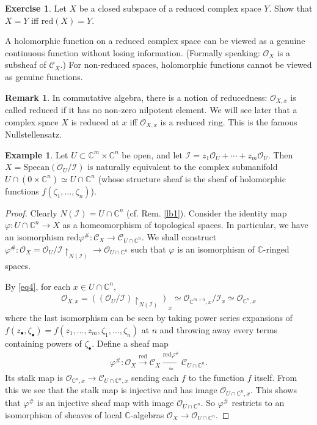 \documentclass[12pt,b5paper,notitlepage]{report}
\theoremstyle{definition}
\newtheorem{eg}[df]{Example}
\newtheorem{exe}[df]{Exercise}
\newtheorem{rem}[df]{Remark}
\theoremstyle{plain}
\newcommand{\mc}{\mathcal}
\newcommand{\scr}{\mathscr}
\newcommand{\blt}{\bullet}
\newcommand{\Cbb}{\mathbb C}
\newcommand{\Specan}{\mathrm{Specan}}
\newcommand{\red}{\mathrm{red}}
\newcommand{\uph}{\upharpoonright}
\numberwithin{equation}{section}
\begin{document}
\begin{exe}
Let $X$ be a closed subspace of a reduced complex space $Y$. Show that $X=Y$ iff $\red(X)=Y$.
\end{exe}

A holomorphic function on a reduced complex space can be viewed as a genuine continuous function without losing information. (Formally speaking: $\scr O_X$ is a subsheaf of $\scr C_X$.) For non-reduced spaces, holomorphic functions cannot be viewed as genuine functions.

\begin{rem}
In commutative algebra, there is a notion of reducedness: $\scr O_{X,x}$ is called reduced if it has no non-zero nilpotent element. We will see later that a complex space $X$ is reduced at $x$ iff $\scr O_{X,x}$ is a reduced ring. This is the famous Nullstellensatz.
\end{rem}

\begin{eg}\label{lb3}
Let $U\subset \Cbb^m\times\Cbb^n$ be open, and let $\mc I=z_1\scr O_U+\cdots+z_m\scr O_U$. Then $X=\Specan(\scr O_U/\mc I)$ is naturally equivalent to the complex submanifold $U\cap (0\times\Cbb^n)\simeq U\cap\Cbb^n$ (whose structure sheaf is the sheaf of holomorphic functions $f(\zeta_1,\dots,\zeta_n)$).
\end{eg}

\begin{proof}
Clearly $N(\mc I)=U\cap \Cbb^n$ (cf. Rem. \ref{lb1}). Consider the identity map $\varphi:U\cap\Cbb^n\rightarrow X$ as a homeomorphism of topological spaces. In particular, we have an isomorphism $\red\varphi^\#:\scr C_X\rightarrow\scr C_{U\cap\Cbb^n}$. We shall construct $\varphi^\#:\scr O_X=\scr O_U/\mc I\uph_{N(\mc I)}\rightarrow\scr O_{U\cap\Cbb^n}$ such that $\varphi$ is an isomorphism of $\Cbb$-ringed spaces.

By \eqref{eq4}, for each $x\in U\cap\Cbb^n$,
\begin{align*}
\scr O_{X,x}=((\scr O_U/\mc I)\uph_{N(\mc I)})_x\simeq\scr O_{\Cbb^{m+n},x}/\mc I_x\simeq\scr O_{\Cbb^n,x}
\end{align*}
where the last isomorphism can be seen  by taking power series expansions of $f(z_\blt,\zeta_\blt)=f(z_1,\dots,z_m,\zeta_1,\dots,\zeta_n)$ at $n$ and throwing away every terms containing powers of $\zeta_\blt$. Define a sheaf map
\begin{align*}
\varphi^\#:\scr O_X\xrightarrow{\red}\scr C_X\xrightarrow[\simeq]{\red\varphi^\#}\scr C_{U\cap\Cbb^n}.
\end{align*}
Its stalk map is $\scr O_{\Cbb^n,x}\rightarrow\scr C_{U\cap\Cbb^n,x}$ sending each $f$ to the function $f$ itself. From this we see that the stalk map is injective and has image $\scr O_{U\cap\Cbb^n,x}$. This shows that $\varphi^\#$ is an injective sheaf map with image $\scr O_{U\cap\Cbb^n}$. So $\varphi^\#$ restricts to an isomorphism of sheaves of local $\Cbb$-algebras $\scr O_X\rightarrow\scr O_{U\cap\Cbb^n}$.
\end{proof}
\end{document}

